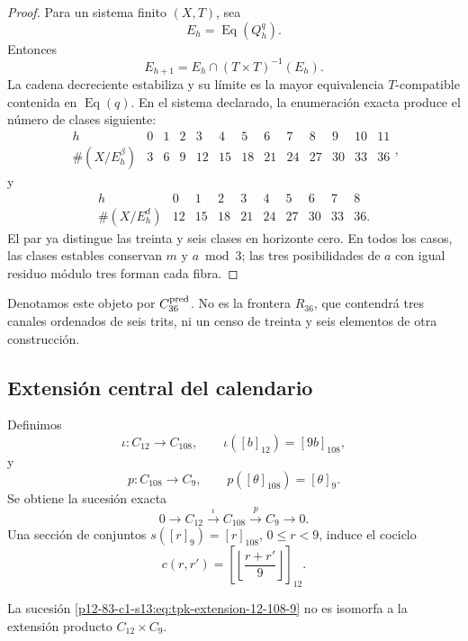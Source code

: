 \begin{proof}
Para un sistema finito \((X,T)\), sea
\[
 E_h=\operatorname{Eq}(Q_h^q).
\]
Entonces
\[
 E_{h+1}=E_h\cap(T\times T)^{-1}(E_h).
\]
La cadena decreciente estabiliza y su límite es la mayor equivalencia
\(T\)-compatible contenida en \(\operatorname{Eq}(q)\). En el sistema
declarado, la enumeración exacta produce el número de clases siguiente:
\[
\begin{array}{c|rrrrrrrrrrrr}
h&0&1&2&3&4&5&6&7&8&9&10&11\\\hline
\#(X/E_h^{\beta})&3&6&9&12&15&18&21&24&27&30&33&36
\end{array},
\]
y
\[
\begin{array}{c|rrrrrrrrr}
h&0&1&2&3&4&5&6&7&8\\\hline
\#(X/E_h^{d})&12&15&18&21&24&27&30&33&36.
\end{array}
\]
El par ya distingue las treinta y seis clases en horizonte cero. En todos
los casos, las clases estables conservan \(m\) y \(a\bmod3\); las tres
posibilidades de \(a\) con igual residuo módulo tres forman cada fibra.
\end{proof}

Denotamos este objeto por \(C_{36}^{\rm pred}\). No es la frontera
\(R_{36}\), que contendrá tres canales ordenados de seis trits, ni un censo
de treinta y seis elementos de otra construcción.

\subsection{Extensión central del calendario}

Definimos
\[
 \iota:C_{12}\longrightarrow C_{108},
 \qquad \iota([b]_{12})=[9b]_{108},
\]
y
\[
 p:C_{108}\longrightarrow C_9,
 \qquad p([\theta]_{108})=[\theta]_9.
\]
Se obtiene la sucesión exacta
\begin{equation}
 0\longrightarrow C_{12}
 \xrightarrow{\ \iota\ }C_{108}
 \xrightarrow{\ p\ }C_9
 \longrightarrow0.
\label{p12-83-c1-s13:eq:tpk-extension-12-108-9}
\end{equation}
Una sección de conjuntos \(s([r]_9)=[r]_{108}\),
\(0\leq r<9\), induce el cociclo
\[
 c(r,r')=
 \left[\left\lfloor\frac{r+r'}{9}\right\rfloor\right]_{12}.
\]

\begin{proposition}
\label{p12-83-c1-s13:prop:tpk-extension-no-escindida}
La sucesión \cref{p12-83-c1-s13:eq:tpk-extension-12-108-9} no es isomorfa a la extensión
producto \(C_{12}\times C_9\).
\end{proposition}

